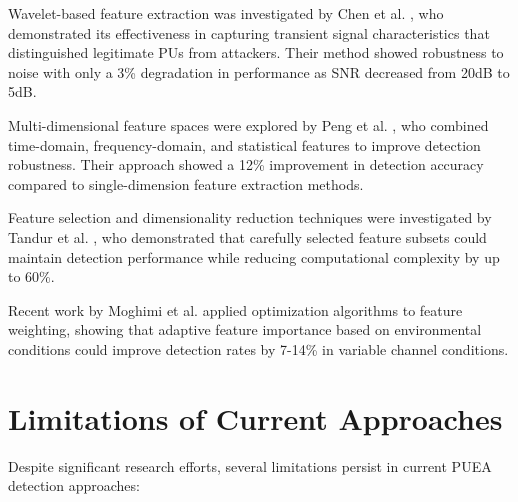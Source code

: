 Wavelet-based feature extraction was investigated by Chen et al. \cite{chen2017wavelet}, who demonstrated its effectiveness in capturing transient signal characteristics that distinguished legitimate PUs from attackers. Their method showed robustness to noise with only a 3\% degradation in performance as SNR decreased from 20dB to 5dB.

Multi-dimensional feature spaces were explored by Peng et al. \cite{peng2018multidimensional}, who combined time-domain, frequency-domain, and statistical features to improve detection robustness. Their approach showed a 12\% improvement in detection accuracy compared to single-dimension feature extraction methods.

Feature selection and dimensionality reduction techniques were investigated by Tandur et al. \cite{tandur2016feature}, who demonstrated that carefully selected feature subsets could maintain detection performance while reducing computational complexity by up to 60\%.

Recent work by Moghimi et al. \cite{moghimi2020optimization} applied optimization algorithms to feature weighting, showing that adaptive feature importance based on environmental conditions could improve detection rates by 7-14\% in variable channel conditions.

\section{Limitations of Current Approaches}

Despite significant research efforts, several limitations persist in current PUEA detection approaches:

